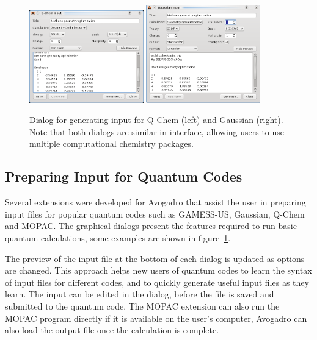 \documentclass[10pt]{bmc_article}
\newenvironment{bmcformat}{\begin{raggedright}
\baselineskip20pt\sloppy\setboolean{publ}{false}}{\end{raggedright}
\baselineskip20pt\sloppy}
\begin{document}
\begin{bmcformat}
\begin{figure}
  \includegraphics[width=0.44\textwidth]{images/avogadro-q-chem}
  \hspace{0.1cm}
  \includegraphics[width=0.44\textwidth]{images/avogadro-gaussian}
  \caption{Dialog for generating input for Q-Chem (left) and Gaussian (right).
    Note that both dialogs are similar in interface, allowing users to use
    multiple computational chemistry packages.}
  \label{f:quantumdialogs}
\end{figure}

\subsection{Preparing Input for Quantum Codes}

Several extensions were developed for Avogadro that assist the user in preparing
input files for popular quantum codes such as GAMESS-US, Gaussian, Q-Chem and
MOPAC. The graphical dialogs present the features required to run basic quantum
calculations, some examples are shown in figure~\ref{f:quantumdialogs}.

The preview of the input file at the bottom of each dialog is updated as options
are changed. This approach helps new users of quantum codes to learn the syntax
of input files for different codes, and to quickly generate useful input files
as they learn. The input can be edited in the dialog, before the file is saved
and submitted to the quantum code. The MOPAC extension can also run the  MOPAC
program directly if it is available on the user's computer, Avogadro can also
load the output file once the calculation is complete.


\end{bmcformat}
\end{document}
